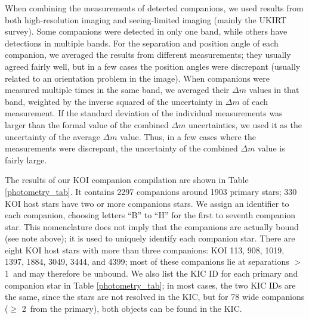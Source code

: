 \documentclass[twocolumn,appendixfloats]{aastex6}
\begin{document}
When combining the measurements of detected companions, we used
results from both high-resolution imaging and seeing-limited imaging
(mainly the UKIRT survey). Some companions were detected in only one 
band, while others have detections in multiple bands. For the separation and
position angle of each companion, we averaged the results from different
measurements; they usually agreed fairly well, but in a few cases the 
position angles were discrepant (usually related to an orientation problem
in the image). When companions were measured multiple times in
the same band, we averaged their $\Delta m$ values in that band, weighted
by the inverse squared of the uncertainty in $\Delta m$ of each measurement.
If the standard deviation of the individual measurements was larger than 
the formal value of the combined $\Delta m$ uncertainties, we used it as 
the uncertainty of the average $\Delta m$ value. Thus, in a few cases where
the measurements were discrepant, the uncertainty of the combined $\Delta m$ 
value is fairly large.

The results of our KOI companion compilation are shown in Table 
\ref{photometry_tab}. It contains 2297 companions around 1903
primary stars; 330 KOI host stars have two or more companions stars.
We assign an identifier to each companion, choosing letters ``B'' to ``H'' 
for the first to seventh companion star. This nomenclature does not imply 
that the companions are actually bound (see note above); it is used to 
uniquely identify each companion star. 
There are eight KOI host stars with more than three companions:
KOI 113, 908, 1019, 1397, 1884, 3049, 3444, and 4399; most of these 
companions lie at separations $>$1\arcsec\ and may therefore be unbound.
We also list the KIC ID for each primary and companion star in Table 
\ref{photometry_tab}; in most cases, the two KIC IDs are the same, since 
the stars are not resolved in the KIC, but for 78 wide companions 
($\geq$ 2\arcsec\ from the primary), both objects can be found 
in the KIC. 
\end{document}

